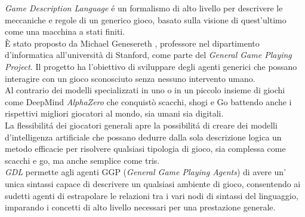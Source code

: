 \textit{Game Description Language} é un formalismo di alto livello per descrivere le meccaniche 
e regole di un generico gioco,
basato sulla visione di quest'ultimo come una macchina a stati finiti. \\
È stato proposto da Michael Genesereth \cite{GDLSpecification}, professore nel dipartimento d'informatica
all'università di Stanford, come parte del \textit{General Game Playing Project}.
Il progetto ha l'obiettivo di sviluppare degli agenti generici che possano interagire 
con un gioco sconosciuto senza nessuno intervento umano. \\
Al contrario dei modelli specializzati in uno o in un piccolo insieme di giochi come 
DeepMind \textit{AlphaZero} \cite{AlphaZero} che conquistò scacchi, 
shogi e Go battendo anche i rispettivi migliori giocatori al mondo, sia umani sia digitali. \\
La flessibilitá dei giocatori generali apre la possibilitá di creare dei modelli d'intelligenza artificiale 
che possano dedurre dalla sola descrizione logica un metodo efficacie per risolvere qualsiasi tipologia di gioco,
sia complessa come scacchi e go, ma anche semplice come tris. \\
\textit{GDL} permette agli agenti GGP (\textit{General Game Playing Agents}) di avere un' 
unica sintassi capace di descrivere un qualsiasi ambiente di gioco, consentendo 
ai sudetti agenti di estrapolare le relazioni tra i vari nodi di sintassi del linguaggio,
imparando i concetti di alto livello necessari per una prestazione generale.

